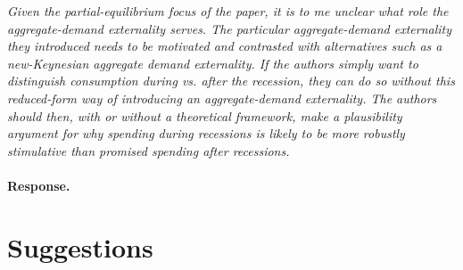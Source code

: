 \documentclass[12pt,letterpaper,english]{article}
\begin{document}
\begin{enumerate}
	\textit{Given the partial-equilibrium focus of the paper, it is to me unclear what role the aggregate-demand externality serves. The particular	aggregate-demand externality they introduced needs to be motivated and contrasted with alternatives such as a new-Keynesian aggregate demand externality. If the authors simply want to distinguish consumption	during vs. after the recession, they can do so without this	reduced-form way of introducing an aggregate-demand externality. The	authors should then, with or without a theoretical framework, make a plausibility argument for why spending during recessions is likely to be more robustly stimulative than promised spending after recessions.}
	
	\paragraph{Response.} 

\end{enumerate}

\section{Suggestions}
\end{document}
